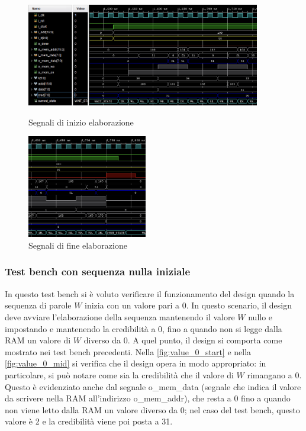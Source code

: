 \documentclass[11pt,a4paper]{article}
\begin{document}
\vspace{0.5em}
\begin{figure}[htbp]
    \centering
    \begin{minipage}{0.65\textwidth}
        \centering
        \includegraphics[height=4.5cm]{resources/cred_0_start.png}
        \caption{Segnali di inizio elaborazione}
        \label{fig:cred_0_start}
    \end{minipage}\hfill
    \begin{minipage}{0.35\textwidth}
        \centering
        \includegraphics[height=4.5cm]{resources/cred_0_end.png}
        \caption{Segnali di fine elaborazione}
        \label{fig:cred_0_end}
    \end{minipage}
    \label{fig:cred_0_sequence}
\end{figure}
\subsubsection{Test bench con sequenza nulla iniziale}

In questo test bench si è voluto verificare il funzionamento del design quando la sequenza di parole $W$ inizia con un valore pari a 0. In questo scenario, il design deve avviare l'elaborazione della sequenza mantenendo il valore $W$ nullo e impostando e mantenendo la credibilità a 0, fino a quando non si legge dalla RAM un valore di $W$ diverso da 0. A quel punto, il design si comporta come mostrato nei test bench precedenti. Nella \autoref{fig:value_0_start} e nella \autoref{fig:value_0_mid} si verifica che il design opera in modo appropriato: in particolare, si può notare come sia la credibilità che il valore di $W$ rimangano a 0. Questo è evidenziato anche dal segnale o\_mem\_data (segnale che indica il valore da scrivere nella RAM all'indirizzo o\_mem\_addr), che resta a 0 fino a quando non viene letto dalla RAM un valore diverso da 0; nel caso del test bench, questo valore è 2 e la credibilità viene poi posta a 31.
\end{document}

